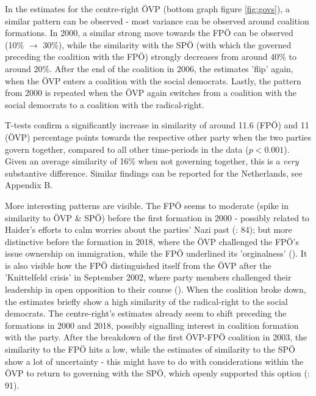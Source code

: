 \documentclass{article}
\begin{document}
In the estimates for the centre-right ÖVP (bottom graph figure \ref{fig:govs}), a similar pattern can be observed - most variance can be observed around coalition formations. In 2000, a similar strong move towards the FPÖ can be observed (10\% $\rightarrow$ 30\%), while the similarity with the SPÖ (with which the governed preceding the coalition with the FPÖ) strongly decreases from around 40\% to around 20\%. After the end of the coalition in 2006, the estimates 'flip' again, when the ÖVP enters a coalition with the social democrats. Lastly, the pattern from 2000 is repeated when the ÖVP again switches from a coalition with the social democrats to a coalition with the radical-right.\par

T-tests confirm a significantly increase in similarity of around 11.6 (FPÖ) and 11 (ÖVP) percentage points towards the respective other party when the two parties govern together, compared to all other time-periods in the data ($p<0.001$). Given an average similarity of 16\% when not governing together, this is a \textit{very} substantive difference. Similar findings can be reported for the Netherlands, see Appendix B.\par

More interesting patterns are visible. The FPÖ seems to moderate (spike in similarity to ÖVP \& SPÖ) before the first formation in 2000 - possibly related to Haider's efforts to calm worries about the parties' Nazi past (\cite{Luther2010}: 84); but more distinctive before the formation in 2018, where the ÖVP challenged the FPÖ's issue ownership on immigration, while the FPÖ underlined its 'orginalness' (\cite{Bodlos2018}). It is also visible how the FPÖ distinguished itself from the ÖVP after the 'Knittelfeld crisis' in September 2002, where party members challenged their leadership in open opposition to their course (\cite{Luther2002}). When the coalition broke down, the estimates briefly show a high similarity of the radical-right to the social democrats. The centre-right's estimates already seem to shift preceding the formations in 2000 and 2018, possibly signalling interest in coalition formation with the party. After the breakdown of the first ÖVP-FPÖ coalition in 2003, the similarity to the FPÖ hits a low, while the estimates of similarity to the SPÖ show a lot of uncertainty - this might have to do with considerations within the ÖVP to return to governing with the SPÖ, which openly supported this option (\cite{Luther2010}: 91). \par
\end{document}
